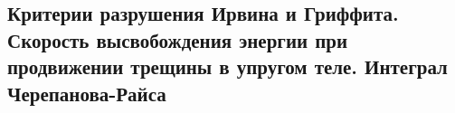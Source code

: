 

\subsection{Критерии разрушения Ирвина и Гриффита. Скорость высвобождения энергии при продвижении трещины в упругом теле. Интеграл Черепанова-Райса}



